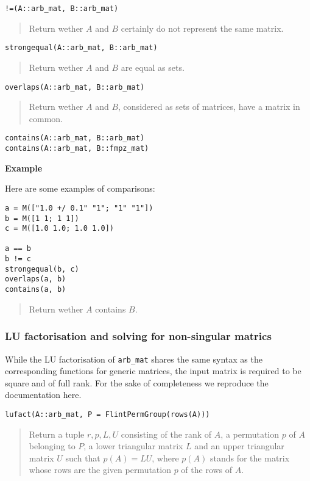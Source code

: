 \documentclass[a4paper,10pt]{article}
\newcommand{\code}{\lstinline}
\newcommand{\desc}[1]{\vspace{-3mm}\begin{quote}#1\end{quote}}
\begin{document}
{{\begin{lstlisting}
!=(A::arb_mat, B::arb_mat)
\end{lstlisting}

\desc{Return wether $A$ and $B$ certainly do not represent the same matrix.}

\begin{lstlisting}
strongequal(A::arb_mat, B::arb_mat)
\end{lstlisting}

\desc{Return wether $A$ and $B$ are equal as sets.}

\begin{lstlisting}
overlaps(A::arb_mat, B::arb_mat)
\end{lstlisting}

\desc{Return wether $A$ and $B$, considered as sets of matrices,
have a matrix in common.}

\begin{lstlisting}
contains(A::arb_mat, B::arb_mat)
contains(A::arb_mat, B::fmpz_mat)
\end{lstlisting}

\textbf{Example}

Here are some examples of comparisons:

\begin{lstlisting}
a = M(["1.0 +/ 0.1" "1"; "1" "1"])
b = M([1 1; 1 1])
c = M([1.0 1.0; 1.0 1.0])

a == b
b != c
strongequal(b, c)
overlaps(a, b)
contains(a, b)
\end{lstlisting}

\desc{Return wether $A$ contains $B$.}

\subsubsection{LU factorisation and solving for non-singular matrics}

While the LU factorisation of \code{arb_mat} shares the same syntax
as the corresponding functions for generic matrices, the input matrix
is required to be square and of full rank. For the sake of completeness
we reproduce the documentation here.

\begin{lstlisting}
lufact(A::arb_mat, P = FlintPermGroup(rows(A)))
\end{lstlisting}

\desc{Return a tuple $r, p, L, U$ consisting of the rank of $A$, a permutation
$p$ of $A$ belonging to $P$, a lower triangular matrix $L$ and an upper
triangular matrix $U$ such that $p(A) = LU$, where $p(A)$ stands for the
matrix whose rows are the given permutation $p$ of the rows of $A$.

}}}
\end{document}
